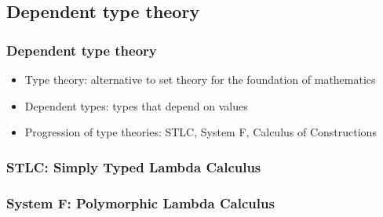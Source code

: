 \documentclass{beamer}
\begin{document}
\subsection{Dependent type theory}
\begin{frame}
\frametitle{Dependent type theory}
\begin{itemize}
\item Type theory: alternative to set theory for the foundation of mathematics
\item Dependent types: types that depend on values
\item Progression of type theories: STLC, System F, Calculus of Constructions
\end{itemize}
\end{frame}

\begin{frame}
\frametitle{STLC: Simply Typed Lambda Calculus}
\begin{prooftree}
\end{prooftree}

\begin{prooftree}
\end{prooftree}

\begin{prooftree}
\end{prooftree}
\end{frame}

\begin{frame}
\frametitle{System F: Polymorphic Lambda Calculus}
\begin{prooftree}
\end{prooftree}

\begin{prooftree}
\end{prooftree}

\begin{prooftree}
\end{prooftree}

\begin{prooftree}
\end{prooftree}

\begin{prooftree}
\end{prooftree}
\end{frame}
\end{document}
